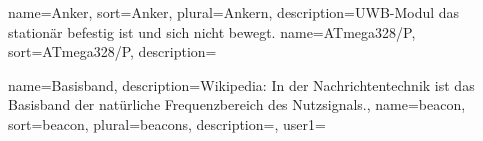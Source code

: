 %
%
%
%


%
%
%



{
	name={Anker}, sort={Anker}, plural={Ankern},
	description={UWB-Modul das stationär befestig ist und sich nicht bewegt.}
}
{
	name={ATmega328/P}, sort={ATmega328/P},
	description={}
}

{
	name={Basisband},
	description={Wikipedia: In der Nachrichtentechnik ist das Basisband der natürliche Frequenzbereich des Nutzsignals.},
}
{
	name={beacon}, sort={beacon}, plural={beacons},
	description={},
	user1={
	}
}



